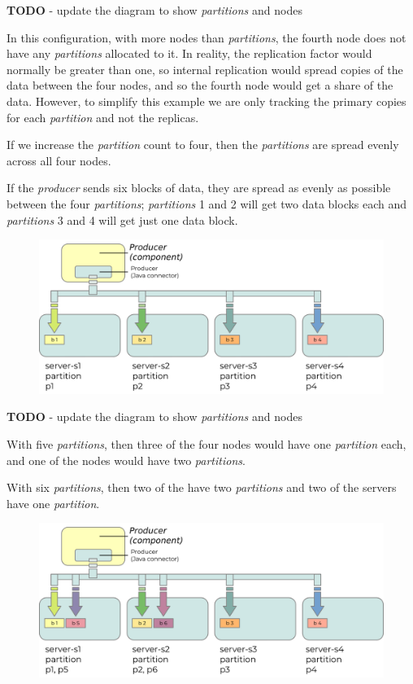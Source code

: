 \documentclass{article}
\newcommand{\kfproducer} {\textit{producer}\xspace}
\newcommand{\kfpartition} {\textit{partition}\xspace}
\newcommand{\kfpartitions} {\textit{partitions}\xspace}
\newcommand{\javaname}[1] {{\ttfamily\color{codeblue} #1}}
\begin{document}
\textbf{TODO} - update the diagram to show \kfpartitions and nodes

In this configuration, with more nodes than \kfpartitions, the fourth node does not have any \kfpartitions allocated to it.
In reality, the replication factor would normally be greater than one, so internal replication would spread copies of the data between the four nodes, and so the fourth node would get a share of the data.
However, to simplify this example we are only tracking the primary copies for each \kfpartition and not the replicas.

If we increase the \kfpartition count to four, then the \kfpartitions are spread evenly across all four nodes.

If the \kfproducer sends six blocks of data, they are spread as evenly as possible between the four \kfpartitions; \kfpartitions 1 and 2 will get two data blocks each and \kfpartitions 3 and 4 will get just one data block.

\begin{figure}[hbt!]
\centering
\includegraphics{images/kafka-partitions-06.png}
%
\label{fig:kafka-partitions-06}
\end{figure}

\textbf{TODO} - update the diagram to show \kfpartitions and nodes

With five \kfpartitions, then three of the four nodes would have one \kfpartition each, and one of the nodes would have two \kfpartitions.

With six \kfpartitions, then two of the have two \kfpartitions and two of the servers have one \kfpartition.

\begin{figure}[hbt!]
\centering
\includegraphics{images/kafka-partitions-08.png}
%
\label{fig:kafka-partitions-07}
\end{figure}
\end{document}
